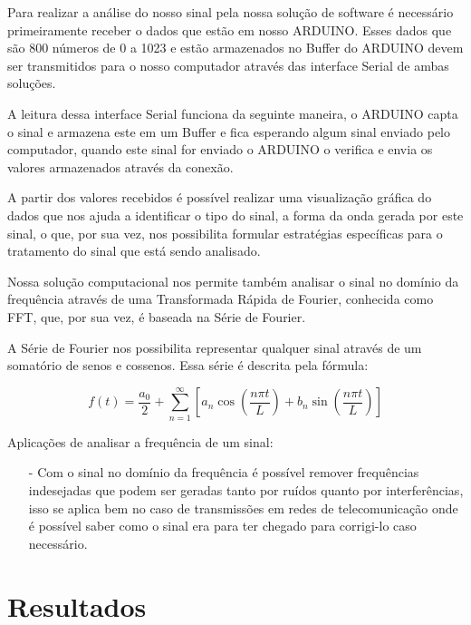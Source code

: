 \documentclass[12pt,a4paper]{report}
\begin{document}
Para realizar a análise do nosso sinal pela nossa solução de software é necessário primeiramente receber o dados que estão em nosso ARDUINO. Esses dados que são 800 números de 0 a 1023 e estão armazenados no Buffer do ARDUINO devem ser transmitidos para o nosso computador através das interface Serial de ambas soluções.

A leitura dessa interface Serial funciona da seguinte maneira, o ARDUINO capta o sinal e armazena este em um Buffer e fica esperando algum sinal enviado pelo computador, quando este sinal for enviado o ARDUINO o verifica e envia os valores armazenados através da conexão.

A partir dos valores recebidos é possível realizar uma visualização gráfica do dados que nos ajuda a identificar o tipo do sinal, a forma da onda gerada por este sinal, o que, por sua vez, nos possibilita formular estratégias específicas para o tratamento do sinal que está sendo analisado.

Nossa solução computacional nos permite também analisar o sinal no domínio da frequência através de uma Transformada Rápida de Fourier, conhecida como FFT, que, por sua vez, é baseada na Série de Fourier.

A Série de Fourier nos possibilita representar qualquer sinal através de um somatório de senos e cossenos. Essa série é descrita pela fórmula:

\begin{equation}
f (t) = \frac{a_{0}}{2} + \sum_{n=1}^{\infty} [ a_{n}\cos{(\frac{n \pi t}{L})} + b_{n}\sin{(\frac{n \pi t}{L})} ]
\label{eq:serie_fourier}
\end{equation}


Aplicações de analisar a frequência de um sinal:

\begin{itemize}
\item [-] Com o sinal no domínio da frequência é possível remover frequências indesejadas que podem ser geradas tanto por ruídos quanto por interferências, isso se aplica bem no caso de transmissões em redes de telecomunicação onde é possível saber como o sinal era para ter chegado para corrigi-lo caso necessário.
\end{itemize}


\chapter{Resultados}

\end{document}
